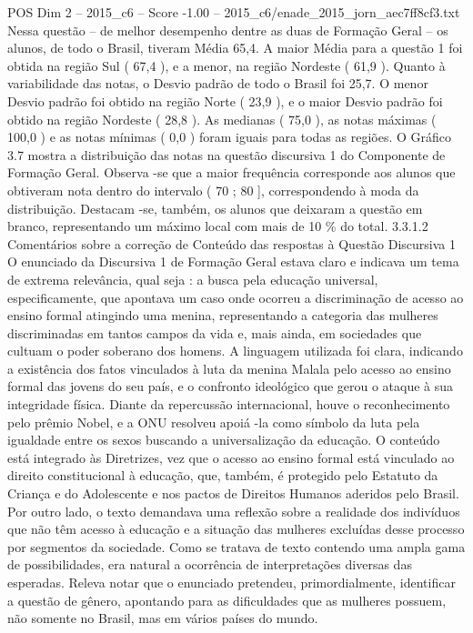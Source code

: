 \begin{textsample}{POS Dim 2 – 2015\_c6 – Score -1.00 – 2015\_c6/enade\_2015\_jorn\_aec7ff8cf3.txt}
Nessa questão – de melhor desempenho dentre as duas de Formação Geral – os alunos, de todo o Brasil, tiveram Média 65,4.
A maior Média para a questão 1 foi obtida na região Sul ( 67,4 ), e a menor, na região Nordeste ( 61,9 ).
Quanto à variabilidade das notas, o Desvio padrão de todo o Brasil foi 25,7.
O menor Desvio padrão foi obtido na região Norte ( 23,9 ), e o maior Desvio padrão foi obtido na região Nordeste ( 28,8 ).
As medianas ( 75,0 ), as notas máximas ( 100,0 ) e as notas mínimas ( 0,0 ) foram iguais para todas as regiões.
O Gráfico 3.7 mostra a distribuição das notas na questão discursiva 1 do Componente de Formação Geral.
Observa -se que a maior frequência corresponde aos alunos que obtiveram nota dentro do intervalo ( 70 ; 80 ], correspondendo à moda da distribuição.
Destacam -se, também, os alunos que deixaram a questão em branco, representando um máximo local com mais de 10 \% do total. 3.3.1.2 Comentários sobre a correção de Conteúdo das respostas à Questão Discursiva 1 O enunciado da Discursiva 1 de Formação Geral estava claro e indicava um tema de extrema relevância, qual seja : a busca pela educação universal, especificamente, que apontava um caso onde ocorreu a discriminação de acesso ao ensino formal atingindo uma menina, representando a categoria das mulheres discriminadas em tantos campos da vida e, mais ainda, em sociedades que cultuam o poder soberano dos homens.
A linguagem utilizada foi clara, indicando a existência dos fatos vinculados à luta da menina Malala pelo acesso ao ensino formal das jovens do seu país, e o confronto ideológico que gerou o ataque à sua integridade física.
Diante da repercussão internacional, houve o reconhecimento pelo prêmio Nobel, e a ONU resolveu apoiá -la como símbolo da luta pela igualdade entre os sexos buscando a universalização da educação.
O conteúdo está integrado às Diretrizes, vez que o acesso ao ensino formal está vinculado ao direito constitucional à educação, que, também, é protegido pelo Estatuto da Criança e do Adolescente e nos pactos de Direitos Humanos aderidos pelo Brasil.
Por outro lado, o texto demandava uma reflexão sobre a realidade dos indivíduos que não têm acesso à educação e a situação das mulheres excluídas desse processo por segmentos da sociedade.
Como se tratava de texto contendo uma ampla gama de possibilidades, era natural a ocorrência de interpretações diversas das esperadas.
Releva notar que o enunciado pretendeu, primordialmente, identificar a questão de gênero, apontando para as dificuldades que as mulheres possuem, não somente no Brasil, mas em vários países do mundo.

\end{textsample}
